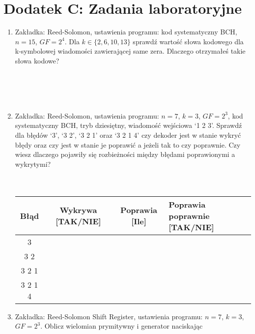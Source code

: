 \setcounter{secnumdepth}{0}
\section*{Dodatek C: Zadania laboratoryjne}

\begin{enumerate}
    \item Zakładka: Reed-Solomon, ustawienia programu: kod systematyczny BCH, $n=15$, $GF=2^4$.
    Dla $k \in \{ 2, 6, 10, 13 \}$ sprawdź wartość słowa kodowego dla k-symbolowej wiadomości zawierającej same zera. Dlaczego otrzymałeś takie słowa kodowe?\\ \\ \\ \\ \\
    \item Zakładka: Reed-Solomon, ustawienia programu: $n = 7$, $k = 3$, $GF = 2^3$,
    kod systematyczny BCH, tryb dziesiętny, wiadomość wejściowa `1 2 3'.
    Sprawdź dla błędów `3', `3 2', `3 2 1' oraz `3 2 1 4' czy dekoder jest w stanie
    wykryć błędy oraz czy jest w stanie je poprawić a jeżeli tak to czy poprawnie.
    Czy wiesz dlaczego pojawiły się rozbieżności między błędami poprawionymi a wykrytymi? \\ \\ \\
    \begin{table}[h]
        \renewcommand{\arraystretch}{1.8}
        \centering
        \begin{tabular}{|c|c|c|>{\centering\arraybackslash}p{5cm}|}
            \hline
            \textbf{Błąd} & \textbf{Wykrywa [TAK/NIE]} & \textbf{Poprawia [Ile]} & \textbf{Poprawia poprawnie [TAK/NIE]} \\
            \hline
            3 & & & \\
            \hline
            3 2 & & & \\
            \hline
            3 2 1 & & & \\
            \hline
            3 2 1 4 & & & \\
            \hline
        \end{tabular}
        \label{tab:rs2}
    \end{table}
    \item Zakładka: Reed-Solomon Shift Register, ustawienia programu:
    $n = 7$, $k = 3$, $GF = 2^3$. Oblicz wielomian prymitywny i generator naciskając

\end{enumerate}
